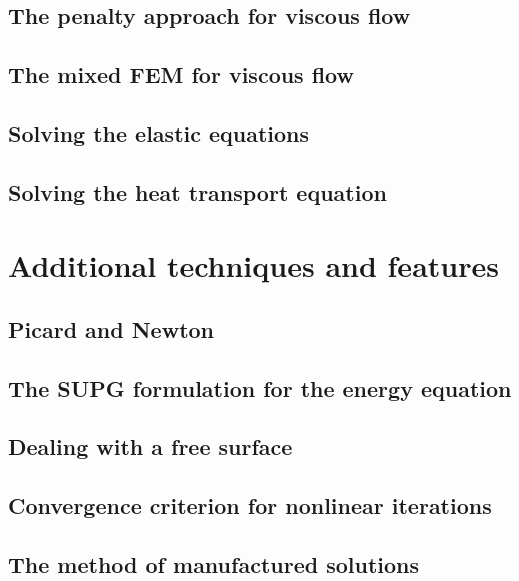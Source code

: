 \documentclass[a4paper]{article}
\begin{document}
\subsection{The penalty approach for viscous flow}  %
\subsection{The mixed FEM for viscous flow}  %
\subsection{Solving the elastic equations} %
\subsection{Solving the heat transport equation}  %




\newpage
\section{Additional techniques and features} %

\subsection{Picard and Newton}

\subsection{The SUPG formulation for the energy equation}

\subsection{Dealing with a free surface}

\subsection{Convergence criterion for nonlinear iterations}


\newpage %
\subsection{The method of manufactured solutions \label{mms}}  %
\newpage %
\end{document}
